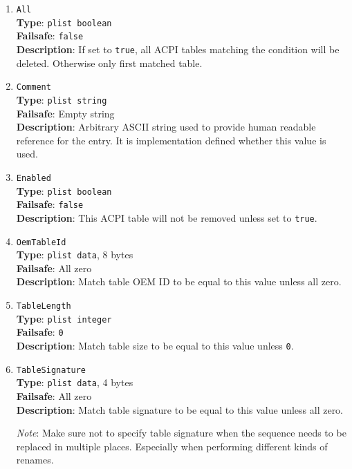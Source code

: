 \documentclass[]{article}
\begin{document}
\begin{enumerate}
\item
  \texttt{All}\\
  \textbf{Type}: \texttt{plist\ boolean}\\
  \textbf{Failsafe}: \texttt{false}\\
  \textbf{Description}: If set to \texttt{true}, all ACPI tables matching the
  condition will be deleted. Otherwise only first matched table.

\item
  \texttt{Comment}\\
  \textbf{Type}: \texttt{plist\ string}\\
  \textbf{Failsafe}: Empty string\\
  \textbf{Description}: Arbitrary ASCII string used to provide human readable
  reference for the entry. It is implementation defined whether this value is
  used.

\item
  \texttt{Enabled}\\
  \textbf{Type}: \texttt{plist\ boolean}\\
  \textbf{Failsafe}: \texttt{false}\\
  \textbf{Description}: This ACPI table will not be removed unless set to
  \texttt{true}.

\item
  \texttt{OemTableId}\\
  \textbf{Type}: \texttt{plist\ data}, 8 bytes\\
  \textbf{Failsafe}: All zero\\
  \textbf{Description}: Match table OEM ID to be equal to this value
  unless all zero.

\item
  \texttt{TableLength}\\
  \textbf{Type}: \texttt{plist\ integer}\\
  \textbf{Failsafe}: \texttt{0}\\
  \textbf{Description}: Match table size to be equal to this value
  unless \texttt{0}.

\item
  \texttt{TableSignature}\\
  \textbf{Type}: \texttt{plist\ data}, 4 bytes\\
  \textbf{Failsafe}: All zero\\
  \textbf{Description}: Match table signature to be equal to this value
  unless all zero.

  \emph{Note}: Make sure not to specify table signature when the sequence
  needs to be replaced in multiple places. Especially when performing
  different kinds of renames.

\end{enumerate}
\end{document}
